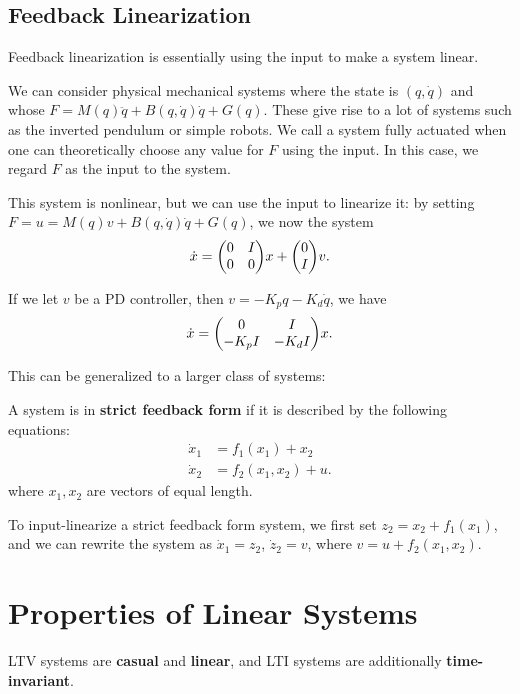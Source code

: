 \subsection{Feedback Linearization}

Feedback linearization is essentially using the input to make a system linear.

We can consider physical mechanical systems where the state is $(q, \dot q)$ and whose $F = M(q)\ddot{q} + B(q, \dot q)\dot{q} + G(q)$. These give rise to a lot of systems such as the inverted pendulum or simple robots. We call a system fully actuated when one can theoretically choose any value for $F$ using the input. In this case, we regard $F$ as the input to the system. 

This system is nonlinear, but we can use the input to linearize it: by setting $F = u = M(q)v + B(q, \dot q)\dot q + G(q)$, we now the system \[\dot x = \mqty(0 & I \\ 0 & 0)x + \mqty(0 \\ I)v.\] 

If we let $v$ be a PD controller, then $v = -K_pq - K_d\dot q$, we have \[\dot x = \mqty(0 & I \\ -K_pI & -K_dI)x.\]

This can be generalized to a larger class of systems:

\begin{definition}
    A system is in \textbf{strict feedback form} if it is described by the following equations:
    \begin{align*}
        \dot x_1 &= f_1(x_1) + x_2\\
        \dot x_2 &= f_2(x_1, x_2) + u.
    \end{align*} where $x_1, x_2$ are vectors of equal length.
\end{definition}

To input-linearize a strict feedback form system, we first set $z_2 = x_2 + f_1(x_1)$, and we can rewrite the system as $\dot x_1 = z_2$, $\dot z_2 = v$, where $v = u + f_2(x_1, x_2)$.

\section{Properties of Linear Systems}

\begin{proposition}
    LTV systems are \textbf{casual} and \textbf{linear}, and LTI systems are additionally \textbf{time-invariant}. 
\end{proposition}

